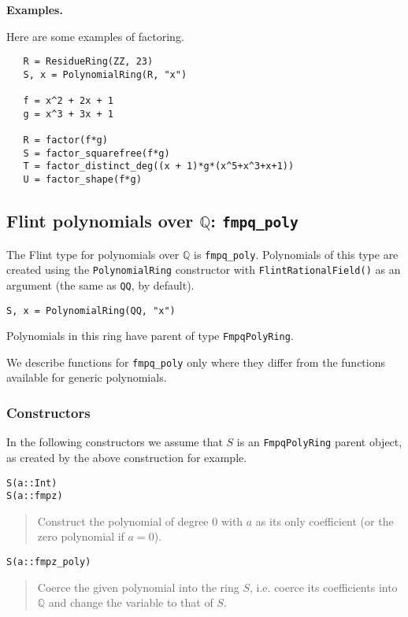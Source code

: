 \documentclass[a4paper,10pt]{article}
\newcommand{\Q}{\mathbb{Q}}
\newcommand{\code}{\lstinline}
\newcommand{\desc}[1]{\vspace{-3mm}\begin{quote}#1\end{quote}}
\begin{document}
{{\textbf{Examples.}

Here are some examples of factoring.

\begin{lstlisting}
   R = ResidueRing(ZZ, 23)
   S, x = PolynomialRing(R, "x")

   f = x^2 + 2x + 1
   g = x^3 + 3x + 1

   R = factor(f*g)
   S = factor_squarefree(f*g)
   T = factor_distinct_deg((x + 1)*g*(x^5+x^3+x+1))
   U = factor_shape(f*g)
\end{lstlisting}

\subsection{Flint polynomials over $\Q$: \code{fmpq_poly}}

The Flint type for polynomials over $\Q$ is \code{fmpq_poly}.
Polynomials of this type are created using the \code{PolynomialRing} constructor with
\code{FlintRationalField()} as an argument (the same as \code{QQ}, by default).  

\begin{lstlisting}
S, x = PolynomialRing(QQ, "x")
\end{lstlisting}

Polynomials in this ring have parent of type \code{FmpqPolyRing}.

We describe functions for \code{fmpq_poly} only where they differ from the functions
available for generic polynomials.

\subsubsection{Constructors}

In the following constructors we assume that $S$ is an \code{FmpqPolyRing} parent 
object, as created by the above construction for example.

\begin{lstlisting}
S(a::Int)
S(a::fmpz)
\end{lstlisting}

\desc{Construct the polynomial of degree $0$ with $a$ as its only coefficient (or
the zero polynomial if $a = 0$).}

\begin{lstlisting}
S(a::fmpz_poly)
\end{lstlisting}

\desc{Coerce the given polynomial into the ring $S$, i.e. coerce its coefficients
into $\Q$ and change the variable to that of $S$.}

}}
\end{document}
